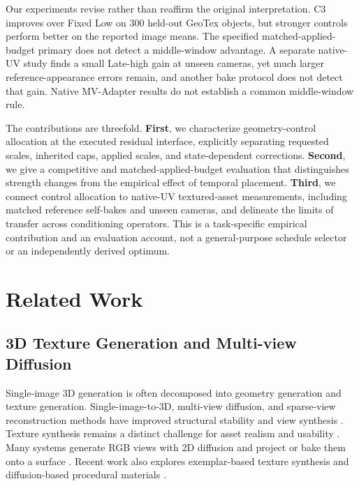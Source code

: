 \documentclass[times,twocolumn,final]{elsarticle}
\begin{document}
Our experiments revise rather than reaffirm the original interpretation. C3 improves over Fixed Low on 300 held-out GeoTex objects, but stronger controls perform better on the reported image means. The specified matched-applied-budget primary does not detect a middle-window advantage. A separate native-UV study finds a small Late-high gain at unseen cameras, yet much larger reference-appearance errors remain, and another bake protocol does not detect that gain. Native MV-Adapter results do not establish a common middle-window rule.

The contributions are threefold. \textbf{First}, we characterize geometry-control allocation at the executed residual interface, explicitly separating requested scales, inherited caps, applied scales, and state-dependent corrections. \textbf{Second}, we give a competitive and matched-applied-budget evaluation that distinguishes strength changes from the empirical effect of temporal placement. \textbf{Third}, we connect control allocation to native-UV textured-asset measurements, including matched reference self-bakes and unseen cameras, and delineate the limits of transfer across conditioning operators. This is a task-specific empirical contribution and an evaluation account, not a general-purpose schedule selector or an independently derived optimum.

\section{Related Work}
\label{sec:related}

\subsection{3D Texture Generation and Multi-view Diffusion}
\label{subsec:3dtex}

Single-image 3D generation is often decomposed into geometry generation and texture generation. Single-image-to-3D, multi-view diffusion, and sparse-view reconstruction methods have improved structural stability and view synthesis \cite{liu2023zero1to3,shi2023zero123pp,liu2023syncdreamer,long2023wonder3d,shi2024mvdream,wang2023imagedream,xu2024instantmesh,ke2024era3d}. Texture synthesis remains a distinct challenge for asset realism and usability \cite{perla2026survey}. Many systems generate RGB views with 2D diffusion and project or bake them onto a surface \cite{chen2023text2tex,richardson2023texture,poole2023dreamfusion,chen2023fantasia3d}. Recent work also explores exemplar-based texture synthesis and diffusion-based procedural materials \cite{guzman2026adaptive,lv2025interpretable}.
\end{document}
